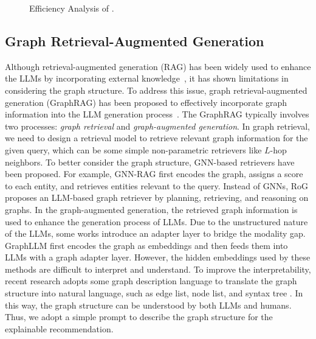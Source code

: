 \begin{figure}[t]
    \centering
    \vspace{-6mm}
    \caption{Efficiency Analysis of \model.} 
    \label{fig:efficient}
    \vspace{-3mm}
\end{figure}


\subsection{Graph Retrieval-Augmented Generation}
Although retrieval-augmented generation (RAG) has been widely used to enhance the LLMs by incorporating external knowledge~\cite{gao2023retrieval,luollm_kg2024}, it has shown limitations in considering the graph structure. To address this issue, graph retrieval-augmented generation (GraphRAG) has been proposed to effectively incorporate graph information into the LLM generation process~\cite{peng2024graph,wang2024contrastive,wang2024large}. The GraphRAG typically involves two processes: \emph{graph retrieval} and \emph{graph-augmented generation}. In graph retrieval, we need to design a retrieval model to retrieve relevant graph information for the given query, which can be some simple non-parametric retrievers like $L$-hop neighbors. To better consider the graph structure, GNN-based \cite{gu2020implicit,chang2020restricted,li2022semi} retrievers have been proposed. For example, GNN-RAG \cite{mavromatis2024gnn} first encodes the graph, assigns a score to each entity, and retrieves entities relevant to the query. Instead of GNNs, RoG \cite{luoreasoning} proposes an LLM-based graph retriever by planning, retrieving, and reasoning on graphs. In the graph-augmented generation, the retrieved graph information is used to enhance the generation process of LLMs. Due to the unstructured nature of the LLMs, some works introduce an adapter layer to bridge the modality gap. GraphLLM \cite{chai2023graphllm} first encodes the graph as embeddings and then feeds them into LLMs with a graph adapter layer. However, the hidden embeddings used by these methods are difficult to interpret and understand. To improve the interpretability, recent research adopts some graph description language to translate the graph structure into natural language, such as edge list, node list, and syntax tree \cite{kim2023kg,zhao2023graphtext,luo2023chatrule}. In this way, the graph structure can be understood by both LLMs and humans. Thus, we adopt a simple prompt to describe the graph structure for the explainable recommendation.